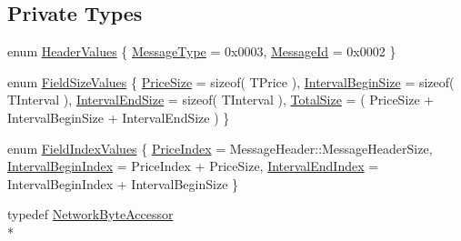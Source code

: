 \subsection*{Private Types}
\begin{DoxyCompactItemize}
\item 
enum \hyperlink{class_terra_swarm_1_1_synchronous_1_1_set_current_price_a940712bcf18dc80c00b4d79fe18edf9b}{Header\-Values} \{ \hyperlink{class_terra_swarm_1_1_synchronous_1_1_set_current_price_a940712bcf18dc80c00b4d79fe18edf9ba465058dd25ba7ae05bc5285a2d3708b1}{Message\-Type} = 0x0003, 
\hyperlink{class_terra_swarm_1_1_synchronous_1_1_set_current_price_a940712bcf18dc80c00b4d79fe18edf9baa56dbab91fc6a488f2a629b3278a7580}{Message\-Id} = 0x0002
 \}
\item 
enum \hyperlink{class_terra_swarm_1_1_synchronous_1_1_set_current_price_a8e183f6b467bff2559f766835197fb5d}{Field\-Size\-Values} \{ \hyperlink{class_terra_swarm_1_1_synchronous_1_1_set_current_price_a8e183f6b467bff2559f766835197fb5da6d42507cf32e815416954a4126721a75}{Price\-Size} = sizeof( T\-Price ), 
\hyperlink{class_terra_swarm_1_1_synchronous_1_1_set_current_price_a8e183f6b467bff2559f766835197fb5da53a8281758edfad40d43fba9a81dc5c5}{Interval\-Begin\-Size} = sizeof( T\-Interval ), 
\hyperlink{class_terra_swarm_1_1_synchronous_1_1_set_current_price_a8e183f6b467bff2559f766835197fb5da289d263a3891286fe193d5c69ad33691}{Interval\-End\-Size} = sizeof( T\-Interval ), 
\hyperlink{class_terra_swarm_1_1_synchronous_1_1_set_current_price_a8e183f6b467bff2559f766835197fb5da6e935dcdc8159878532d28b745c005c8}{Total\-Size} = ( Price\-Size + Interval\-Begin\-Size + Interval\-End\-Size )
 \}
\item 
enum \hyperlink{class_terra_swarm_1_1_synchronous_1_1_set_current_price_a1e2f6ce793cf79b121b76b6903e9df58}{Field\-Index\-Values} \{ \hyperlink{class_terra_swarm_1_1_synchronous_1_1_set_current_price_a1e2f6ce793cf79b121b76b6903e9df58a5885a64cfebb23b330bc57406aeca87c}{Price\-Index} = Message\-Header\-:\-:Message\-Header\-Size, 
\hyperlink{class_terra_swarm_1_1_synchronous_1_1_set_current_price_a1e2f6ce793cf79b121b76b6903e9df58ad2470cb4012d8a03a476f2c0a7ed837d}{Interval\-Begin\-Index} = Price\-Index + Price\-Size, 
\hyperlink{class_terra_swarm_1_1_synchronous_1_1_set_current_price_a1e2f6ce793cf79b121b76b6903e9df58a2a78676d8ac8e4de4e131d71736f086c}{Interval\-End\-Index} = Interval\-Begin\-Index + Interval\-Begin\-Size
 \}
\item 
typedef \hyperlink{class_terra_swarm_1_1_network_byte_accessor}{Network\-Byte\-Accessor}\\*

\end{DoxyCompactItemize}
